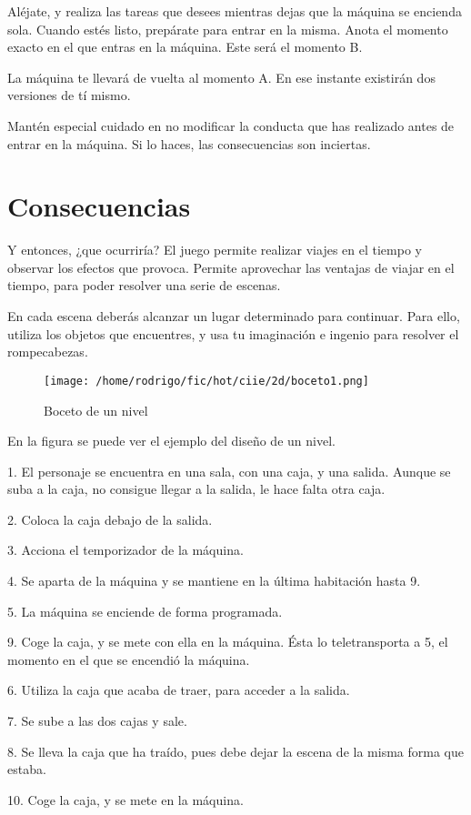 \documentclass[11pt,a4paper]{article}
\begin{document}
Aléjate, y realiza las tareas que desees mientras dejas que la máquina se encienda sola.  
Cuando estés listo, prepárate para entrar en la misma. Anota el momento exacto 
en el que entras en la máquina. Este será el momento B.

La máquina te llevará de vuelta al momento A. En ese instante existirán dos 
versiones de tí mismo.

Mantén especial cuidado en no modificar la conducta que has realizado antes de 
entrar en la máquina. Si lo haces, las consecuencias son inciertas. 

\section{Consecuencias}

Y entonces, ¿que ocurriría? El juego permite realizar viajes en el tiempo y observar los efectos que provoca. Permite aprovechar las ventajas de viajar en el tiempo, para poder resolver una serie de escenas.

En cada escena deberás alcanzar un lugar determinado para continuar. Para ello, 
utiliza los objetos que encuentres, y usa tu imaginación e ingenio para resolver 
el rompecabezas.

\begin{figure}[htp]
\centering
\texttt{[image: /home/rodrigo/fic/hot/ciie/2d/boceto1.png]}
\caption{Boceto de un nivel}
\label{}
\end{figure}

En la figura se puede ver el ejemplo del diseño de un nivel.

1. El personaje se encuentra en una sala, con una caja, y una salida. Aunque se suba a la caja, no consigue llegar a la salida, le hace falta otra caja.

2. Coloca la caja debajo de la salida.

3. Acciona el temporizador de la máquina.

4. Se aparta de la máquina y se mantiene en la última habitación hasta 9.

5. La máquina se enciende de forma programada.

9. Coge la caja, y se mete con ella en la máquina. Ésta lo teletransporta a 5, el momento en el que se encendió la máquina.

6. Utiliza la caja que acaba de traer, para acceder a la salida.

7. Se sube a las dos cajas y sale.

8. Se lleva la caja que ha traído, pues debe dejar la escena de la misma forma que estaba.

10. Coge la caja, y se mete en la máquina.
\end{document}
